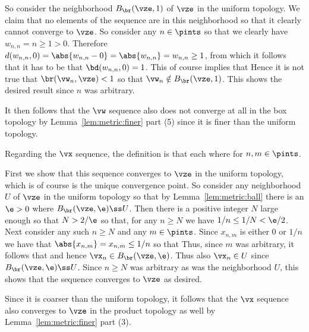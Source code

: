 {{    So consider the neighborhood $B_{\br}(\vze, 1)$ of $\vze$ in the uniform topology.
    We claim that no elements of the sequence are in this neighborhood so that it clearly cannot converge to $\vze$.
    So consider any $n \in \pints$ so that we clearly have $w_{n,n} = n \geq 1 > 0$.
    Therefore $d(w_{n,n}, 0) = \abs{w_{n,n} - 0} = \abs{w_{n,n}} = w_{n,n} \geq 1$, from which it follows that it has to be that $\bd(w_{n,n}, 0) = 1$.
    This of course implies that
    Hence it is not true that $\br(\vw_n, \vze) < 1$ so that $\vw_n \notin B_{\br}(\vze, 1)$.
    This shows the desired result since $n$ was arbitrary.

    It then follows that the $\vw$ sequence also does not converge at all in the box topology by Lemma~\ref{lem:metric:finer} part (5) since it is finer than the uniform topology.

    Regarding the $\vx$ sequence, the definition is that each
    where
    for $n,m \in \pints$.

    First we show that this sequence converges to $\vze$ in the uniform topology, which is of course is the unique convergence point.
    So consider any neighborhood $U$ of $\vze$ in the uniform topology so that by Lemma~\ref{lem:metric:ball} there is an $\e > 0$ where $B_{\br}(\vze, \e) \ss U$.
    Then there is a positive integer $N$ large enough so that $N > 2/\e$ so that, for any $n \geq N$ we have $1/n \leq 1/N < \e/2$.
    Next consider any such $n \geq N$ and any $m \in \pints$.
    Since $x_{n,m}$ is either $0$ or $1/n$ we have that $\abs{x_{n,m}} = x_{n,m} \leq 1/n$ so that
    Thus, since $m$ was arbitrary, it follows that
    and hence $\vx_n \in B_{\br}(\vze, \e)$.
    Thus also $\vx_n \in U$ since $B_{\br}(\vze, \e) \ss U$.
    Since $n \geq N$ was arbitrary as was the neighborhood $U$, this shows that the sequence converges to $\vze$ as desired.

    Since it is coarser than the uniform topology, it follows that the $\vx$ sequence also converges to $\vze$ in the product topology as well by Lemma~\ref{lem:metric:finer} part (3).

}}
